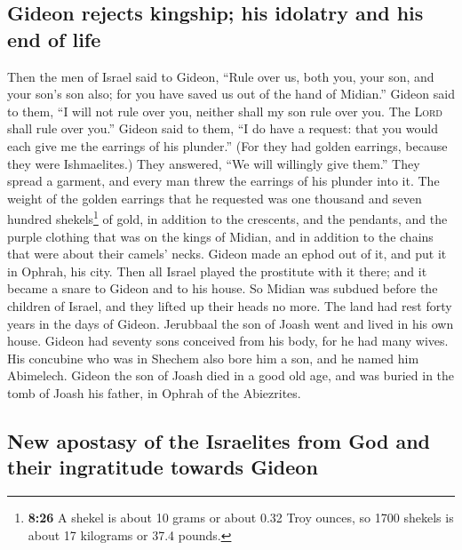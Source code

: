 \hypertarget{gideon-rejects-kingship-his-idolatry-and-his-end-of-life}{%
\subsection{Gideon rejects kingship; his idolatry and his end of
life}\label{gideon-rejects-kingship-his-idolatry-and-his-end-of-life}}

 Then the men of Israel said to Gideon, ``Rule over us,
both you, your son, and your son's son also; for you have saved us out
of the hand of Midian.''  Gideon said to them, ``I will
not rule over you, neither shall my son rule over you. The \textsc{Lord}
shall rule over you.''  Gideon said to them, ``I do have
a request: that you would each give me the earrings of his plunder.''
(For they had golden earrings, because they were Ishmaelites.)
 They answered, ``We will willingly give them.'' They
spread a garment, and every man threw the earrings of his plunder into
it.  The weight of the golden earrings that he requested
was one thousand and seven hundred shekels\footnote{\textbf{8:26} A
  shekel is about 10 grams or about 0.32 Troy ounces, so 1700 shekels is
  about 17 kilograms or 37.4 pounds.} of gold, in addition to the
crescents, and the pendants, and the purple clothing that was on the
kings of Midian, and in addition to the chains that were about their
camels' necks.  Gideon made an ephod out of it, and put
it in Ophrah, his city. Then all Israel played the prostitute with it
there; and it became a snare to Gideon and to his house. 
So Midian was subdued before the children of Israel, and they lifted up
their heads no more. The land had rest forty years in the days of
Gideon.  Jerubbaal the son of Joash went and lived in his
own house.  Gideon had seventy sons conceived from his
body, for he had many wives.  His concubine who was in
Shechem also bore him a son, and he named him Abimelech. 
Gideon the son of Joash died in a good old age, and was buried in the
tomb of Joash his father, in Ophrah of the Abiezrites.

\hypertarget{new-apostasy-of-the-israelites-from-god-and-their-ingratitude-towards-gideon}{%
\subsection{New apostasy of the Israelites from God and their
ingratitude towards
Gideon}\label{new-apostasy-of-the-israelites-from-god-and-their-ingratitude-towards-gideon}}

